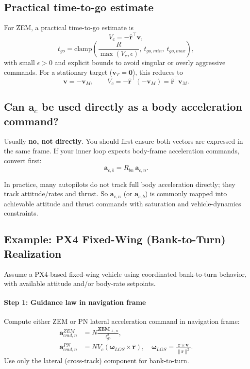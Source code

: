 \documentclass[11pt,a4paper]{article}
\begin{document}
\subsection*{Practical time-to-go estimate}
For ZEM, a practical time-to-go estimate is
\begin{equation}
V_c = -\hat{\mathbf{r}}^\top\mathbf{v},
\end{equation}
\begin{equation}
t_{go} = \mathrm{clamp}\!\left(\frac{R}{\max(V_c,\epsilon)},\ t_{go,min},\ t_{go,max}\right),
\end{equation}
with small $\epsilon > 0$ and explicit bounds to avoid singular or overly aggressive commands.
For a stationary target ($\mathbf{v}_T=\mathbf{0}$), this reduces to
\begin{equation}
\mathbf{v} = -\mathbf{v}_M,
\qquad
V_c = -\hat{\mathbf{r}}^\top(-\mathbf{v}_M) = \hat{\mathbf{r}}^\top\mathbf{v}_M.
\end{equation}

\subsection*{Can $\mathbf{a}_c$ be used directly as a body acceleration command?}
Usually \textbf{no, not directly}. You should first ensure both vectors are expressed in the same frame.
If your inner loop expects body-frame acceleration commands, convert first:
\begin{equation}
\mathbf{a}_{c,b} = R_{bn}\,\mathbf{a}_{c,n}.
\end{equation}

In practice, many autopilots do not track full body acceleration directly; they track attitude/rates and thrust.
So $\mathbf{a}_{c,n}$ (or $\mathbf{a}_{c,b}$) is commonly mapped into achievable attitude and thrust commands with saturation and vehicle-dynamics constraints.

\subsection{Example: PX4 Fixed-Wing (Bank-to-Turn) Realization}
Assume a PX4-based fixed-wing vehicle using coordinated bank-to-turn behavior, with available attitude and/or body-rate setpoints.

\paragraph{Step 1: Guidance law in navigation frame}
Compute either ZEM or PN lateral acceleration command in navigation frame:
\begin{align}
\mathbf{a}_{cmd,n}^{ZEM} &= N\frac{\mathbf{ZEM}_{\perp,n}}{t_{go}^2}, \\
\mathbf{a}_{cmd,n}^{PN}  &= N V_c\left(\boldsymbol{\omega}_{LOS}\times\hat{\mathbf{r}}\right),
\quad
\boldsymbol{\omega}_{LOS}=\frac{\mathbf{r}\times\mathbf{v}}{\|\mathbf{r}\|^2}.
\end{align}
Use only the lateral (cross-track) component for bank-to-turn.
\end{document}
